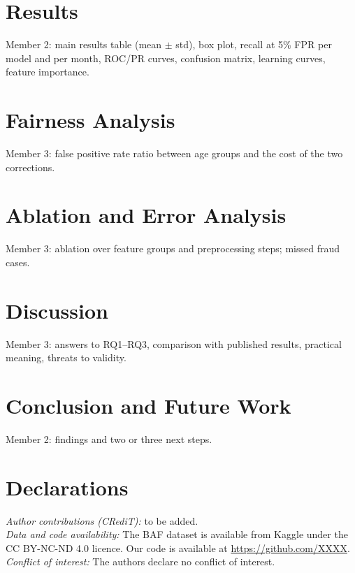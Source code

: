 \documentclass{ieeeaccess}
\begin{document}



\section{Results}
\label{sec:results}
Member 2: main results table (mean $\pm$ std), box plot, recall at 5\% FPR per model and per month,
ROC/PR curves, confusion matrix, learning curves, feature importance.


\section{Fairness Analysis}
\label{sec:fairness}
Member 3: false positive rate ratio between age groups and the cost of the two corrections.

\section{Ablation and Error Analysis}
\label{sec:ablation}
Member 3: ablation over feature groups and preprocessing steps; missed fraud cases.

\section{Discussion}
\label{sec:discussion}
Member 3: answers to RQ1--RQ3, comparison with published results, practical meaning, threats to validity.

\section{Conclusion and Future Work}
\label{sec:conclusion}
Member 2: findings and two or three next steps.

\section*{Declarations}
\textit{Author contributions (CRediT):} to be added.\\
\textit{Data and code availability:} The BAF dataset is available from Kaggle under the CC BY-NC-ND 4.0
licence. Our code is available at \url{https://github.com/XXXX}.\\
\textit{Conflict of interest:} The authors declare no conflict of interest.




\EOD
\end{document}
